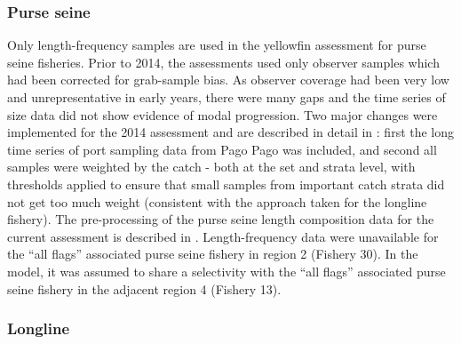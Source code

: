 \subsubsection{Purse seine}
\label{sec:size_PS}

Only length-frequency samples are used in the yellowfin assessment for purse seine fisheries. Prior to 2014, the assessments used only observer samples which had been corrected for grab-sample bias. As observer coverage had been very low and unrepresentative in early years, there were many gaps and the time series of size data did not show evidence of modal progression. Two major changes were implemented for the 2014 assessment and are described in detail in \citet{abascal_analysis_2014}: first the long time series of port sampling data from Pago Pago was included, and second all samples were weighted by the catch - both at the set and strata level, with thresholds applied to ensure that small samples from important catch strata did not get too much weight (consistent with the approach taken for the longline fishery). The pre-processing of the purse seine length composition data for the current assessment is described in \citet{peatman_analysis_2023}. Length-frequency data were unavailable for the \enquote{all flags} associated purse seine fishery in region 2 (Fishery 30). In the model, it was assumed to share a selectivity with the \enquote{all flags} associated purse seine fishery in the adjacent region 4 (Fishery 13).

\subsubsection{Longline}
\label{sec:size_LL}

